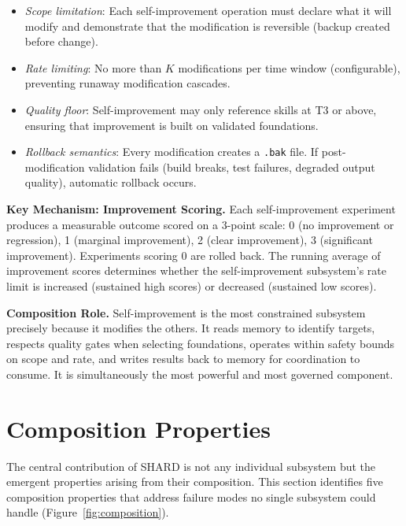 \documentclass[11pt]{article}
\begin{document}
\begin{itemize}[nosep]
\item \emph{Scope limitation}: Each self-improvement operation must declare what it will modify and demonstrate that the modification is reversible (backup created before change).
\item \emph{Rate limiting}: No more than $K$ modifications per time window (configurable), preventing runaway modification cascades.
\item \emph{Quality floor}: Self-improvement may only reference skills at T3 or above, ensuring that improvement is built on validated foundations.
\item \emph{Rollback semantics}: Every modification creates a \texttt{.bak} file. If post-modification validation fails (build breaks, test failures, degraded output quality), automatic rollback occurs.
\end{itemize}

\textbf{Key Mechanism: Improvement Scoring.} Each self-improvement experiment produces a measurable outcome scored on a 3-point scale: 0 (no improvement or regression), 1 (marginal improvement), 2 (clear improvement), 3 (significant improvement). Experiments scoring 0 are rolled back. The running average of improvement scores determines whether the self-improvement subsystem's rate limit is increased (sustained high scores) or decreased (sustained low scores).

\textbf{Composition Role.} Self-improvement is the most constrained subsystem precisely because it modifies the others. It reads memory to identify targets, respects quality gates when selecting foundations, operates within safety bounds on scope and rate, and writes results back to memory for coordination to consume. It is simultaneously the most powerful and most governed component.

\section{Composition Properties}

The central contribution of SHARD is not any individual subsystem but the emergent properties arising from their composition. This section identifies five composition properties that address failure modes no single subsystem could handle (Figure~\ref{fig:composition}).
\end{document}
